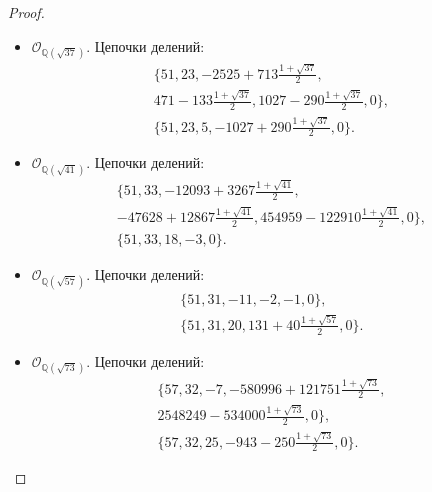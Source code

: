 \documentclass[_00_dissertation.tex]{subfiles}
\begin{document}
\begin{proof}
\begin{itemize}
        \item $\mathcal{O}_{\mathbb{Q}(\sqrt{37})}$.
        Цепочки делений:
        \begin{equation*}
            \begin{split}
                \{51, 23, -2525+713\frac{1+\sqrt{37}}{2},\\
                    471-133\frac{1+\sqrt{37}}{2}, 1027-290\frac{1+\sqrt{37}}{2}, 0\},\\
                \{51, 23, 5, -1027+290\frac{1+\sqrt{37}}{2}, 0\}.
            \end{split}
        \end{equation*}
    
        \item $\mathcal{O}_{\mathbb{Q}(\sqrt{41})}$.
        Цепочки делений:
        \begin{equation*}
            \begin{split}
                \{51, 33, -12093+3267\frac{1+\sqrt{41}}{2},\\
                    -47628+12867\frac{1+\sqrt{41}}{2}, 454959-122910\frac{1+\sqrt{41}}{2}, 0\},\\
                \{51, 33, 18, -3, 0\}.
            \end{split}
        \end{equation*}
    
        \item $\mathcal{O}_{\mathbb{Q}(\sqrt{57})}$.
        Цепочки делений:
        \begin{equation*}
            \begin{split}
                \{51, 31, -11, -2, -1, 0\},\\
                \{51, 31, 20, 131+40\frac{1+\sqrt{57}}{2}, 0\}.
            \end{split}
        \end{equation*}
    
        \item $\mathcal{O}_{\mathbb{Q}(\sqrt{73})}$.
        Цепочки делений:
        \begin{equation*}
            \begin{split}
                \{57, 32, -7, -580996+121751\frac{1+\sqrt{73}}{2},\\
                    2548249-534000\frac{1+\sqrt{73}}{2}, 0\},\\
                \{57, 32, 25, -943-250\frac{1+\sqrt{73}}{2}, 0\}.
            \end{split}
        \end{equation*}
    \end{itemize}
    
\end{proof}
\end{document}

